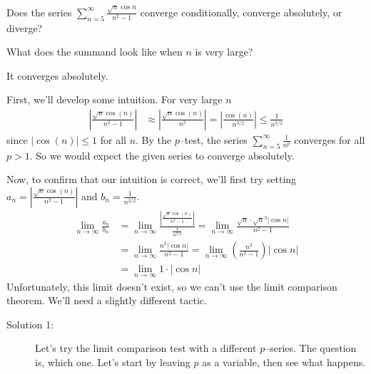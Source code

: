 \begin{Mquestion}[2016Q5]
Does the series $\displaystyle \sum_{n=5}^\infty \frac{\sqrt{n}\cos n}{n^2-1}$
converge conditionally, converge absolutely, or diverge?
\end{Mquestion}

\begin{hint}
What does the summand look like when $n$ is very large?
\end{hint}

\begin{answer}
It converges absolutely.
\end{answer}

\begin{solution}
First, we'll develop some intuition. For very large $n$
\begin{align*}
\left|\frac{\sqrt{n}\cos(n)}{n^2-1}\right|
&\approx \left|\frac{\sqrt{n}\cos(n)}{n^2}\right|
= \left|\frac{\cos(n)}{n^{3/2}}\right|
\le \frac{1}{n^{3/2}}
\end{align*}
since $\left|\cos(n)\right| \leq 1$ for all $n$. By the $p$--test, the series
$\displaystyle \sum_{n=5}^\infty \frac{1}{n^p}$ converges for all $p>1$. So we would
expect the given series to converge absolutely.

Now, to confirm that our intuition is correct, we'll first try setting
$a_n=\left| \frac{\sqrt{n}\cos(n)}{n^2-1}\right|$
and $b_n = \frac{1}{n^{3/2}}$.
\begin{align*}
\lim_{n \to \infty}\frac{a_n}{b_n}&=\lim_{n \to \infty} \frac{\left|\frac{\sqrt{n}\cos(n)}{n^2-1}\right| }{\frac{1}{n^{3/2}}} = \lim_{n \to \infty}\frac{\sqrt{n}\cdot\sqrt{n}^3|\cos n|}{n^2-1}\\
&=\lim_{n \to \infty}\frac{n^2|\cos n|}{n^2-1} = \lim_{n \to \infty}\left(\frac{n^2}{n^2-1}\right)|\cos n|\\
& = \lim_{n \to \infty}1\cdot|\cos n|
\end{align*}
Unfortunately, this limit doesn't exist, so we can't use the limit comparison theorem. We'll need a slightly different tactic.

\begin{description}
\item[Solution 1:] Let's try the limit comparison test with a different $p$--series. The question is, which one. Let's start by leaving $p$ as a variable, then see what happens.


\end{description}
\end{solution}

